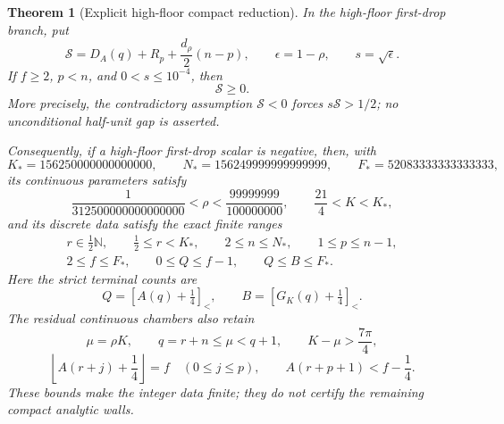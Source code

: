 \documentclass[11pt]{article}
\newtheorem{theorem}{Theorem}[section]
\theoremstyle{remark}
\newcommand{\N}{\mathbb N}
\newcommand{\sbr}[1]{[#1]_{<}}
\begin{document}
\begin{theorem}[Explicit high-floor compact reduction]
\label{thm:high-floor-explicit-compact}
In the high-floor first-drop branch, put
\[
 \mathcal S=D_A(q)+R_p+\frac{d_\rho}{2}(n-p),\qquad
 \epsilon=1-\rho,\qquad s=\sqrt\epsilon.
\]
If $f\geq2$, $p<n$, and $0<s\leq10^{-4}$, then
\begin{equation}
 \boxed{\mathcal S\geq0.}
 \label{eq:explicit-high-floor-no-negative}
\end{equation}
More precisely, the contradictory assumption $\mathcal S<0$ forces
$s\mathcal S>1/2$; no unconditional half-unit gap is asserted.

Consequently, if a high-floor first-drop scalar is negative, then, with
\[
 K_*=156250000000000000,\qquad
 N_*=156249999999999999,\qquad
 F_*=52083333333333333,
\]
its continuous parameters satisfy
\begin{equation}
 \boxed{
 \frac1{312500000000000000}<\rho
 <\frac{99999999}{100000000},\qquad
 \frac{21}{4}<K<K_* ,}
 \label{eq:explicit-high-floor-continuous-box}
\end{equation}
and its discrete data satisfy the exact finite ranges
\begin{equation}
 \boxed{
 \begin{gathered}
 r\in\tfrac12\N,\qquad \tfrac12\leq r<K_*,\qquad
 2\leq n\leq N_*,\qquad 1\leq p\leq n-1,\\
 2\leq f\leq F_*,\qquad
 0\leq Q\leq f-1,\qquad Q\leq B\leq F_*.
 \end{gathered}}
 \label{eq:explicit-high-floor-discrete-box}
\end{equation}
Here the strict terminal counts are
\[
 Q=\sbr{A(q)+\tfrac14},\qquad
 B=\sbr{G_K(q)+\tfrac14}.
\]
The residual continuous chambers also retain
\begin{equation}
 \mu=\rho K,\qquad q=r+n\leq\mu<q+1,\qquad
 K-\mu>\frac{7\pi}{4},
 \label{eq:explicit-high-floor-chamber-one}
\end{equation}
\begin{equation}
 \left\lfloor A(r+j)+\frac14\right\rfloor=f
 \quad(0\leq j\leq p),\qquad
 A(r+p+1)<f-\frac14.
 \label{eq:explicit-high-floor-chamber-two}
\end{equation}
These bounds make the integer data finite; they do not certify the
remaining compact analytic walls.
\end{theorem}
\end{document}
